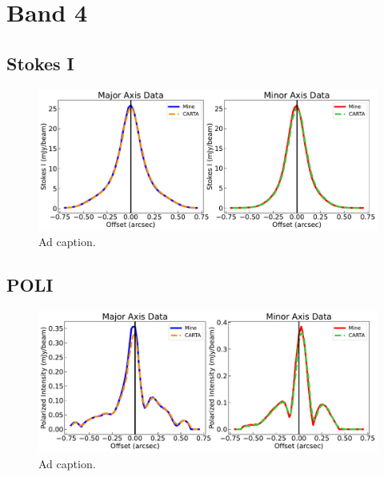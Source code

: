 \section{Band 4}
\subsection{Stokes I}
\begin{figure}[h]
  \centering
  \includegraphics[width=2\textwidth]{WRITEUP_AND_IMAGES/IMAGES/IRS63_StokesI_slice_BAND4.pdf}
  \caption{Ad caption.}
  \label{fig: }
\end{figure}


\subsection{POLI}
\begin{figure}[h]
  \centering
  \includegraphics[width=2\textwidth]{WRITEUP_AND_IMAGES/IMAGES/IRS63_POLI_slice_BAND4.pdf}
  \caption{Ad caption.}
  \label{fig: }
\end{figure}
